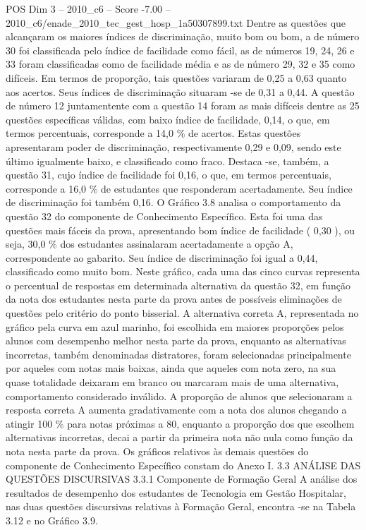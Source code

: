 \begin{textsample}{POS Dim 3 – 2010\_c6 – Score -7.00 – 2010\_c6/enade\_2010\_tec\_gest\_hosp\_1a50307899.txt}
Dentre as questões que alcançaram os maiores índices de discriminação, muito bom ou bom, a de número 30 foi classificada pelo índice de facilidade como fácil, as de números 19, 24, 26 e 33 foram classificadas como de facilidade média e as de número 29, 32 e 35 como difíceis.
Em termos de proporção, tais questões variaram de 0,25 a 0,63 quanto aos acertos.
Seus índices de discriminação situaram -se de 0,31 a 0,44.
A questão de número 12 juntamentente com a questão 14 foram as mais difíceis dentre as 25 questões específicas válidas, com baixo índice de facilidade, 0,14, o que, em termos percentuais, corresponde a 14,0 \% de acertos.
Estas questões apresentaram poder de discriminação, respectivamente 0,29 e 0,09, sendo este último igualmente baixo, e classificado como fraco.
Destaca -se, também, a questão 31, cujo índice de facilidade foi 0,16, o que, em termos percentuais, corresponde a 16,0 \% de estudantes que responderam acertadamente.
Seu índice de discriminação foi também 0,16.
O Gráfico 3.8 analisa o comportamento da questão 32 do componente de Conhecimento Específico.
Esta foi uma das questões mais fáceis da prova, apresentando bom índice de facilidade ( 0,30 ), ou seja, 30,0 \% dos estudantes assinalaram acertadamente a opção A, correspondente ao gabarito.
Seu índice de discriminação foi igual a 0,44, classificado como muito bom.
Neste gráfico, cada uma das cinco curvas representa o percentual de respostas em determinada alternativa da questão 32, em função da nota dos estudantes nesta parte da prova antes de possíveis eliminações de questões pelo critério do ponto bisserial.
A alternativa correta A, representada no gráfico pela curva em azul marinho, foi escolhida em maiores proporções pelos alunos com desempenho melhor nesta parte da prova, enquanto as alternativas incorretas, também denominadas distratores, foram selecionadas principalmente por aqueles com notas mais baixas, ainda que aqueles com nota zero, na sua quase totalidade deixaram em branco ou marcaram mais de uma alternativa, comportamento considerado inválido.
A proporção de alunos que selecionaram a resposta correta A aumenta gradativamente com a nota dos alunos chegando a atingir 100 \% para notas próximas a 80, enquanto a proporção dos que escolhem alternativas incorretas, decai a partir da primeira nota não nula como função da nota nesta parte da prova.
Os gráficos relativos às demais questões do componente de Conhecimento Específico constam do Anexo I. 3.3 ANÁLISE DAS QUESTÕES DISCURSIVAS 3.3.1 Componente de Formação Geral A análise dos resultados de desempenho dos estudantes de Tecnologia em Gestão Hospitalar, nas duas questões discursivas relativas à Formação Geral, encontra -se na Tabela 3.12 e no Gráfico 3.9.

\end{textsample}
